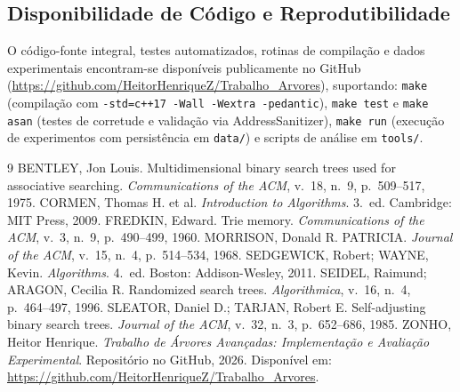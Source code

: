 \documentclass[11pt, a4paper]{article}
\begin{document}
\subsection*{Disponibilidade de Código e Reprodutibilidade}
\label{sec:repositorio}
O código-fonte integral, testes automatizados, rotinas de compilação e dados experimentais encontram-se disponíveis publicamente no GitHub (\url{https://github.com/HeitorHenriqueZ/Trabalho_Arvores}), suportando: \texttt{make} (compilação com \texttt{-std=c++17 -Wall -Wextra -pedantic}), \texttt{make test} e \texttt{make asan} (testes de corretude e validação via AddressSanitizer), \texttt{make run} (execução de experimentos com persistência em \texttt{data/}) e scripts de análise em \texttt{tools/}.

\begin{thebibliography}{9}
\small
\setlength{\itemsep}{0pt}
\setlength{\parskip}{0pt}
BENTLEY, Jon Louis. Multidimensional binary search trees used for associative searching. \textit{Communications of the ACM}, v.~18, n.~9, p.~509--517, 1975.
CORMEN, Thomas H. et al. \textit{Introduction to Algorithms}. 3.~ed. Cambridge: MIT Press, 2009.
FREDKIN, Edward. Trie memory. \textit{Communications of the ACM}, v.~3, n.~9, p.~490--499, 1960.
MORRISON, Donald R. PATRICIA. \textit{Journal of the ACM}, v.~15, n.~4, p.~514--534, 1968.
SEDGEWICK, Robert; WAYNE, Kevin. \textit{Algorithms}. 4.~ed. Boston: Addison-Wesley, 2011.
SEIDEL, Raimund; ARAGON, Cecilia R. Randomized search trees. \textit{Algorithmica}, v.~16, n.~4, p.~464--497, 1996.
SLEATOR, Daniel D.; TARJAN, Robert E. Self-adjusting binary search trees. \textit{Journal of the ACM}, v.~32, n.~3, p.~652--686, 1985.
ZONHO, Heitor Henrique. \textit{Trabalho de Árvores Avançadas: Implementação e Avaliação Experimental}. Repositório no GitHub, 2026. Disponível em: \url{https://github.com/HeitorHenriqueZ/Trabalho_Arvores}.
\end{thebibliography}
\end{document}
